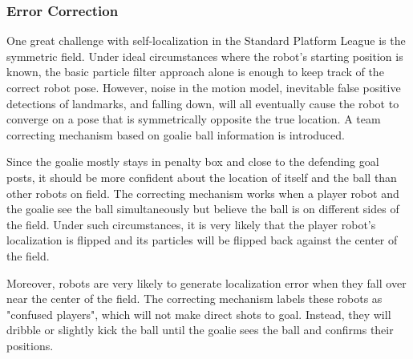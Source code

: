 \documentclass{article}
\begin{document}
\subsubsection{Error Correction}
	One great challenge with self-localization in the Standard Platform League is the symmetric field. Under ideal circumstances where the robot's starting position is known, the basic particle filter approach alone is enough to keep track of the correct robot pose. However, noise in the motion model, inevitable false positive detections of landmarks, and falling down, will all eventually cause the robot to converge on a pose that is symmetrically opposite the true location. A team correcting mechanism based on goalie ball information is introduced.

	Since the goalie mostly stays in penalty box and close to the defending goal posts, it should be more confident about the location of itself and the ball than other robots on field. The correcting mechanism works when a player robot and the goalie see the ball simultaneously but believe the ball is on different sides of the field. Under such circumstances, it is very likely that the player robot's localization is flipped and its particles will be flipped back against the center of the field.

	Moreover, robots are very likely to generate localization error when they fall over near the center of the field. The correcting mechanism labels these robots as "confused players", which will not make direct shots to goal. Instead, they will dribble or slightly kick the ball until the goalie sees the ball and confirms their positions.
\end{document}
